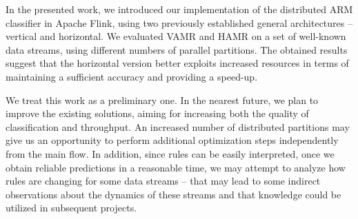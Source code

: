 \documentclass[journal]{IEEEtran}
\begin{document}
In the presented work, we introduced our implementation of the distributed ARM classifier in Apache Flink, using two previously established general architectures -- vertical and horizontal. We evaluated VAMR and HAMR on a set of well-known data streams, using different numbers of parallel partitions. The obtained results suggest that the horizontal version better exploits increased resources in terms of maintaining a sufficient accuracy and providing a speed-up.

We treat this work as a preliminary one. In the nearest future, we plan to improve the existing solutions, aiming for increasing both the quality of classification and throughput. An increased number of distributed partitions may give us an opportunity to perform additional optimization steps independently from the main flow. In addition, since rules can be easily interpreted, once we obtain reliable predictions in a reasonable time, we may attempt to analyze how rules are changing for some data streams -- that may lead to some indirect observations about the dynamics of these streams and that knowledge could be utilized in subsequent projects.

\end{document}
